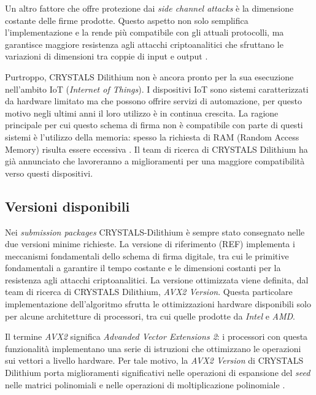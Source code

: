 Un altro fattore che offre protezione dai \textit{side channel attacks} è la dimensione costante delle firme prodotte. Questo aspetto non solo semplifica l'implementazione e la rende più compatibile con gli attuali protocolli, ma garantisce maggiore resistenza agli attacchi criptoanalitici che sfruttano le variazioni di dimensioni tra coppie di input e output \cite{crystalsdilithium-submissionpackage-three}.

Purtroppo, CRYSTALS Dilithium non è ancora pronto per la sua esecuzione nell'ambito IoT (\textit{Internet of Things}). I dispositivi IoT sono sistemi caratterizzati da hardware limitato ma che possono offrire servizi di automazione, per questo motivo negli ultimi anni il loro utilizzo è in continua crescita. La ragione principale per cui questo schema di firma non è compatibile con parte di questi sistemi è l'utilizzo della memoria: spesso la richiesta di RAM (Random Access Memory) risulta essere eccessiva \cite{crystalsdilithium-submissionpackage-one}. Il team di ricerca di CRYSTALS Dilithium ha già annunciato che lavoreranno a miglioramenti per una maggiore compatibilità verso questi dispositivi.

\subsection{Versioni disponibili}

Nei \textit{submission packages} CRYSTALS-Dilithium è sempre stato consegnato nelle due versioni minime richieste. La versione di riferimento (REF) implementa i meccanismi fondamentali dello schema di firma digitale, tra cui le primitive fondamentali a garantire il tempo costante e le dimensioni costanti per la resistenza agli attacchi criptoanalitici. La versione ottimizzata viene definita, dal team di ricerca di CRYSTALS Dilithium, \textit{AVX2 Version}. Questa particolare implementazione dell'algoritmo sfrutta le ottimizzazioni hardware disponibili solo per alcune architetture di processori, tra cui quelle prodotte da \textit{Intel} e \textit{AMD}.

Il termine \textit{AVX2} significa \textit{Advanded Vector Extensions 2}: i processori con questa funzionalità implementano una serie di istruzioni che ottimizzano le operazioni sui vettori a livello hardware. Per tale motivo, la \textit{AVX2 Version} di CRYSTALS Dilithium porta miglioramenti significativi nelle operazioni di espansione del \textit{seed} nelle matrici polinomiali e nelle operazioni di moltiplicazione polinomiale \cite{crystalsdilithium-submissionpackage-one}.

